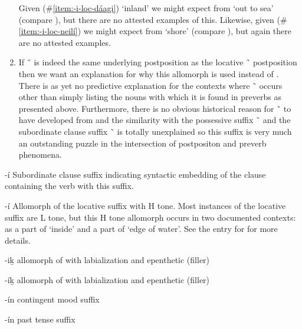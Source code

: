 \begin{morphdesc}[resume*=alphalist]
\begin{enumerate}
		Given  (\#\ref{item:-i-loc-dáag̱i}) ‘inland’ we might expect
			 from  ‘out to sea’ (compare ),
			but there are no attested examples of this.
		Likewise, given  (\#\ref{item:-i-loc-neilí}) we might expect
			 from  ‘shore’ (compare ),
			but again there are no attested examples.
	\item\label{item:-i-loc-discussion}
		If  \~\  is indeed the same underlying postposition as the locative
			 \~\  postposition then we want an explanation for why this
			allomorph is used instead of .
		There is as yet no predictive explanation for the contexts where  \~\ 
			occurs other than simply listing the nouns with which it is found in preverbs
			as presented above.
		Furthermore, there is no obvious historical reason for  \~\  to have
			developed from  and the similarity with the possessive suffix
			 \~\  and the subordinate clause suffix  \~\ 
			is totally unexplained so this suffix is very much an outstanding puzzle
			in the intersection of postpositon and preverb phenomena.
	\end{enumerate}

\item[-í]\label{m:-í-sub}
	Subordinate clause suffix indicating syntactic embedding of the clause containing the
		verb with this suffix.

\item[-í]\label{m:-í-loc}
	Allomorph of the locative suffix  with H tone.
	Most instances of the locative suffix are L tone, but this H tone allomorph occurs
		in two documented contexts: as a part of  ‘inside’
		and a part of  ‘edge of water’.
	See the entry for  for more details.

\item[-iḵ]\label{m:-iḵ}
	allomorph of  with labialization and epenthetic (filler) 

\item[-íḵ]\label{m:-íḵ}
	allomorph of  with labialization and epenthetic (filler) 

\item[-ín]\label{m:-ín-ctng}
	contingent mood suffix

\item[-ín]\label{m:-ín-past}
	past tense suffix
\end{morphdesc}
